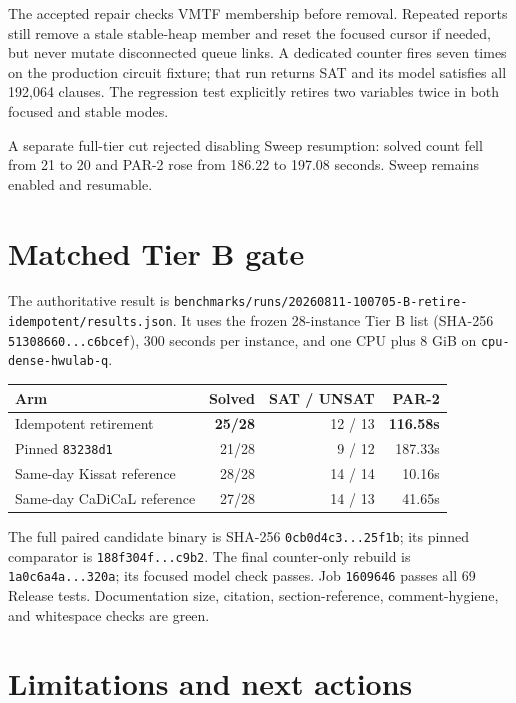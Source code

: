 \documentclass[11pt]{article}
\newcommand{\code}[1]{\nolinkurl{#1}}
\newcommand{\kissat}{Kissat}
\begin{document}
The accepted repair checks VMTF membership before removal. Repeated reports
still remove a stale stable-heap member and reset the focused cursor if needed,
but never mutate disconnected queue links. A dedicated counter fires seven
times on the production circuit fixture; that run returns SAT and its model
satisfies all 192,064 clauses. The regression test explicitly retires two
variables twice in both focused and stable modes.

A separate full-tier cut rejected disabling Sweep resumption: solved count
fell from 21 to 20 and PAR-2 rose from 186.22 to 197.08 seconds. Sweep remains
enabled and resumable.

\section{Matched Tier B gate}

The authoritative result is
\code{benchmarks/runs/20260811-100705-B-retire-idempotent/results.json}.
It uses the frozen 28-instance Tier B list (SHA-256
\code{51308660...c6bcef}), 300 seconds per instance, and one CPU plus 8 GiB on
\code{cpu-dense-hwulab-q}.

\begin{center}
\begin{tabular}{lrrr}
\toprule
Arm & Solved & SAT / UNSAT & PAR-2 \\
\midrule
Idempotent retirement & \textbf{25/28} & 12 / 13 & \textbf{116.58s} \\
Pinned \code{83238d1} & 21/28 & 9 / 12 & 187.33s \\
Same-day \kissat{} reference & 28/28 & 14 / 14 & 10.16s \\
Same-day CaDiCaL reference & 27/28 & 14 / 13 & 41.65s \\
\bottomrule
\end{tabular}
\end{center}

The full paired candidate binary is SHA-256 \code{0cb0d4c3...25f1b}; its
pinned comparator is \code{188f304f...c9b2}. The final counter-only rebuild is
\code{1a0c6a4a...320a}; its focused model check passes. Job \code{1609646}
passes all 69 Release tests. Documentation size, citation, section-reference,
comment-hygiene, and whitespace checks are green.

\section{Limitations and next actions}
\end{document}
